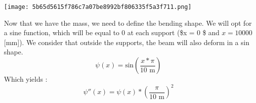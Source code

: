 \begin{Shaded}
\begin{Highlighting}[]
\NormalTok{(}
\OperatorTok{=}\OperatorTok{=}
\OperatorTok{=}\NormalTok{))}
\OperatorTok{=}\NormalTok{))}
\OperatorTok{=}\OperatorTok{=}\NormalTok{)}
\NormalTok{)}
\end{Highlighting}
\end{Shaded}

\texttt{[image: 5b65d5615f786c7a07be8992bf806335f5a3f711.png]}

Now that we have the mass, we need to define the bending shape. We will
opt for a sine function, which will be equal to 0 at each support (\$x =
0 \$ and \(x = 10000\) {[}mm{]}). We consider that outside the supports,
the beam will also deform in a sin shape.
\[ \psi(x) = \text{sin}(\frac{x*\pi}{10 \text{ m}}) \] Which yields :
\[ \psi''(x) = \psi(x) * \left (\frac{\pi}{10 \text{ m}} \right )^2 \]

\begin{Shaded}
\begin{Highlighting}[]
\OperatorTok{=}\OperatorTok{*}\OperatorTok{/}\NormalTok{)}
\OperatorTok{=}\OperatorTok{*}\OperatorTok{/}\NormalTok{)}\OperatorTok{**} 
\end{Highlighting}
\end{Shaded}

\begin{Shaded}
\begin{Highlighting}[]
\OperatorTok{=}\NormalTok{(}\NormalTok{, }\NormalTok{))}
\OperatorTok{=}\NormalTok{)}
\NormalTok{plt.scatter([}\NormalTok{, }\NormalTok{], [}\NormalTok{,}\NormalTok{])}
\NormalTok{plt.scatter(x[i(}\NormalTok{)], psi[i(}\NormalTok{)])}
\NormalTok{)}
\NormalTok{)}
\NormalTok{)}

\end{Highlighting}
\end{Shaded}

